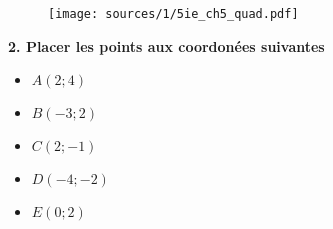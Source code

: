 \documentclass[10pt]{article}
\begin{document}
\begin{multicols}{2}
  \begin{figure}[H]
    \centering
    \texttt{[image: sources/1/5ie\_ch5\_quad.pdf]}
  \end{figure}    

  \textbf{2. Placer les points aux coordonées suivantes}

  \begin{itemize}
  \item $A(2  ;  4)$
  \item $B(-3 ;  2)$
  \item $C(2  ; -1)$
  \item $D(-4 ; -2)$
  \item $E(0  ;  2)$
  \end{itemize}

\end{multicols}
\end{document}
